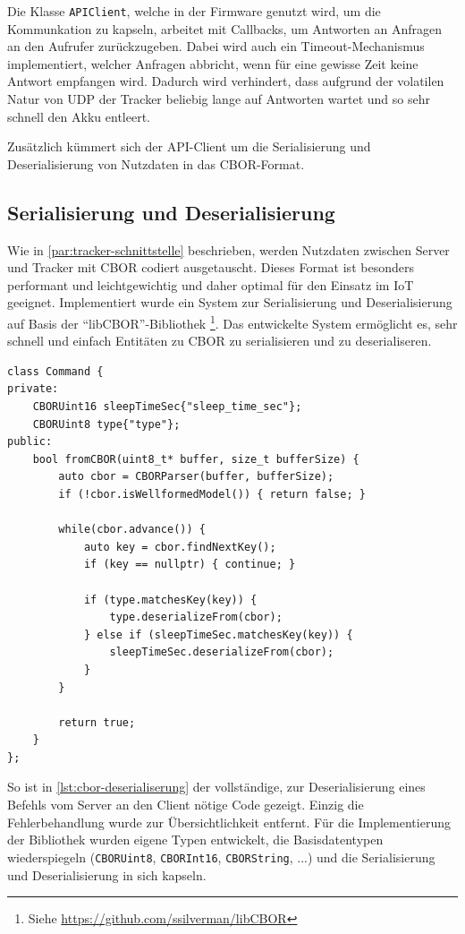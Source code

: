 Die Klasse \texttt{APIClient}, welche in der Firmware genutzt wird, um die Kommunkation zu kapseln,
arbeitet mit Callbacks, um Antworten an Anfragen an den Aufrufer zurückzugeben. Dabei wird auch ein
Timeout-Mechanismus implementiert, welcher Anfragen abbricht, wenn für eine gewisse Zeit keine
Antwort empfangen wird. Dadurch wird verhindert, dass aufgrund der volatilen Natur von \gls{UDP} der
Tracker beliebig lange auf Antworten wartet und so sehr schnell den \gls{Akku} entleert.

Zusätzlich kümmert sich der \gls{API}-Client um die Serialisierung und Deserialisierung von
Nutzdaten in das \gls{CBOR}-Format.

\subsection{Serialisierung und Deserialisierung}

Wie in \autoref{par:tracker-schnittstelle} beschrieben, werden Nutzdaten zwischen Server und Tracker
mit \gls{CBOR} codiert ausgetauscht. Dieses Format ist besonders performant und leichtgewichtig und
daher optimal für den Einsatz im \gls{IoT} geeignet. Implementiert wurde ein System zur
Serialisierung und Deserialisierung auf Basis der \enquote{libCBOR}-Bibliothek \footnote{Siehe
\url{https://github.com/ssilverman/libCBOR}}. Das entwickelte System ermöglicht es, sehr schnell und
einfach Entitäten zu \gls{CBOR} zu serialisieren und zu deserialiseren.

\begin{lstlisting}[caption={Beispiel zur Deserialisierung von \glsentryshort{CBOR} mit den
entwickelten Helferklassen},label={lst:cbor-deserialiserung}]
class Command {
private:
	CBORUint16 sleepTimeSec{"sleep_time_sec"};
	CBORUint8 type{"type"};
public:
	bool fromCBOR(uint8_t* buffer, size_t bufferSize) {
		auto cbor = CBORParser(buffer, bufferSize);
		if (!cbor.isWellformedModel()) { return false; }

		while(cbor.advance()) {
			auto key = cbor.findNextKey();
			if (key == nullptr) { continue; }

			if (type.matchesKey(key)) {
				type.deserializeFrom(cbor);
			} else if (sleepTimeSec.matchesKey(key)) {
				sleepTimeSec.deserializeFrom(cbor);
			}
		}

		return true;
	}
};
\end{lstlisting}

So ist in \autoref{lst:cbor-deserialiserung} der vollständige, zur Deserialisierung eines Befehls
vom Server an den Client nötige Code gezeigt. Einzig die Fehlerbehandlung wurde zur
Übersichtlichkeit entfernt. Für die Implementierung der Bibliothek wurden eigene Typen entwickelt,
die Basisdatentypen wiederspiegeln (\texttt{CBORUint8}, \texttt{CBORInt16}, \texttt{CBORString},
...) und die Serialisierung und Deserialisierung in sich kapseln.

